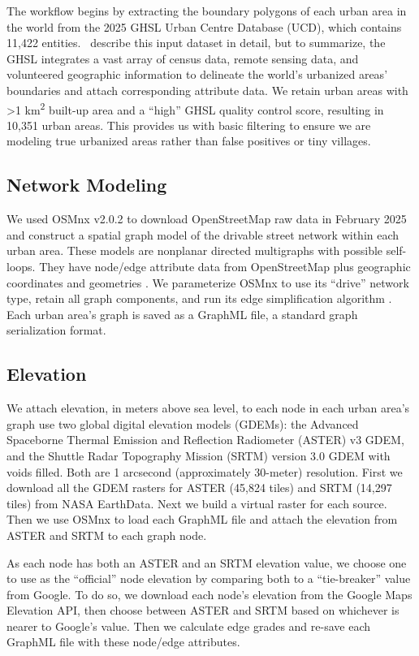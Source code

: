 \documentclass[12pt,letterpaper]{article} %
\begin{document}
The workflow begins by extracting the boundary polygons of each urban area in the world from the 2025 GHSL Urban Centre Database (UCD), which contains 11,422 entities.\ \citet{mari_rivero_urban_2025} describe this input dataset in detail, but to summarize, the GHSL integrates a vast array of census data, remote sensing data, and volunteered geographic information to delineate the world's urbanized areas' boundaries and attach corresponding attribute data. We retain urban areas with >1 km\textsuperscript{2} built-up area and a \enquote{high} GHSL quality control score, resulting in 10,351 urban areas. This provides us with basic filtering to ensure we are modeling true urbanized areas rather than false positives or tiny villages.

\subsection{Network Modeling}

We used OSMnx v2.0.2 to download OpenStreetMap raw data in February 2025 and construct a spatial graph model of the drivable street network within each urban area. These models are nonplanar directed multigraphs with possible self-loops. They have node/edge attribute data from OpenStreetMap plus geographic coordinates and geometries \citep{boeing_modeling_2025}. We parameterize OSMnx to use its \enquote{drive} network type, retain all graph components, and run its edge simplification algorithm \citep{boeing_topological_2025}. Each urban area's graph is saved as a GraphML file, a standard graph serialization format.

\subsection{Elevation}

We attach elevation, in meters above sea level, to each node in each urban area's graph use two global digital elevation models (GDEMs): the Advanced Spaceborne Thermal Emission and Reflection Radiometer (ASTER) v3 GDEM, and the Shuttle Radar Topography Mission (SRTM) version 3.0 GDEM with voids filled. Both are 1 arcsecond (approximately 30-meter) resolution. First we download all the GDEM rasters for ASTER (45,824 tiles) and SRTM (14,297 tiles) from NASA EarthData. Next we build a virtual raster for each source. Then we use OSMnx to load each GraphML file and attach the elevation from ASTER and SRTM to each graph node.

As each node has both an ASTER and an SRTM elevation value, we choose one to use as the \enquote{official} node elevation by comparing both to a \enquote{tie-breaker} value from Google. To do so, we download each node's elevation from the Google Maps Elevation API, then choose between ASTER and SRTM based on whichever is nearer to Google's value. Then we calculate edge grades and re-save each GraphML file with these node/edge attributes.
\end{document}
